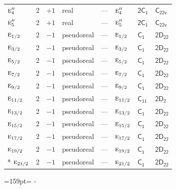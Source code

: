 \documentclass[10pt,a4paper]{article}
\makeatletter
\def\grouprule#1#2{\noalign{\marks\LTgroupmarks{\the\belowrulesep}\nobreak\vskip#1%
  \vskip\aboverulesep}\multispan\LT@cols\unskip{\leaders\hrule\@height#2\hfill\kern\z@}\cr
  \noalign{\penalty\LTrulebreak\vskip\belowrulesep\global\@lastruleclass\z@}}
\newcommand{\needspace}[1]{\par\penalty-100\begingroup\dimen0=#1\relax\dimen2=\pagegoal
  \advance\dimen2-\pagetotal\ifdim\dimen0>\dimen2\relax\ifdim\dimen2>0pt\vfil\break\fi\fi
  \endgroup}
\numberwithin{equation}{section}
\newcommand{\grp}[1]{\mathsf{#1}}
\newcommand{\irr}[1]{\text{\normalfont\scshape #1}}
\makeatother
\begin{document}
{\begin{longtable}{@{}lrrlllll@{}}
$\irr{e}_{4}''$ & 2 & $+1$ & real & --- & $\irr{e}_{4}''$ & \href{2C1.pdf}{$\grp{2C_{1}}$} & $\grp{C_{22v}}$\\
$\irr{e}_{5}''$ & 2 & $+1$ & real & --- & $\irr{e}_{5}''$ & \href{2C1.pdf}{$\grp{2C_{1}}$} & $\grp{C_{22v}}$\\
\grouprule{0pt}{\lightrulewidth}
$\irr{e}_{1/2}$ & 2 & $-1$ & pseudoreal & --- & $\irr{e}_{1/2}$ & \href{C1.pdf}{$\grp{C_{1}}$} & $\grp{2D_{22}}$\\
$\irr{e}_{3/2}$ & 2 & $-1$ & pseudoreal & --- & $\irr{e}_{3/2}$ & \href{C1.pdf}{$\grp{C_{1}}$} & $\grp{2D_{22}}$\\
$\irr{e}_{5/2}$ & 2 & $-1$ & pseudoreal & --- & $\irr{e}_{5/2}$ & \href{C1.pdf}{$\grp{C_{1}}$} & $\grp{2D_{22}}$\\
$\irr{e}_{7/2}$ & 2 & $-1$ & pseudoreal & --- & $\irr{e}_{7/2}$ & \href{C1.pdf}{$\grp{C_{1}}$} & $\grp{2D_{22}}$\\
$\irr{e}_{9/2}$ & 2 & $-1$ & pseudoreal & --- & $\irr{e}_{9/2}$ & \href{C1.pdf}{$\grp{C_{1}}$} & $\grp{2D_{22}}$\\
$\irr{e}_{11/2}$ & 2 & $-1$ & pseudoreal & --- & $\irr{e}_{11/2}$ & \href{C11.pdf}{$\grp{C_{11}}$} & \href{2D2.pdf}{$\grp{2D_{2}}$}\\
$\irr{e}_{13/2}$ & 2 & $-1$ & pseudoreal & --- & $\irr{e}_{13/2}$ & \href{C1.pdf}{$\grp{C_{1}}$} & $\grp{2D_{22}}$\\
$\irr{e}_{15/2}$ & 2 & $-1$ & pseudoreal & --- & $\irr{e}_{15/2}$ & \href{C1.pdf}{$\grp{C_{1}}$} & $\grp{2D_{22}}$\\
$\irr{e}_{17/2}$ & 2 & $-1$ & pseudoreal & --- & $\irr{e}_{17/2}$ & \href{C1.pdf}{$\grp{C_{1}}$} & $\grp{2D_{22}}$\\
$\irr{e}_{19/2}$ & 2 & $-1$ & pseudoreal & --- & $\irr{e}_{19/2}$ & \href{C1.pdf}{$\grp{C_{1}}$} & $\grp{2D_{22}}$\\*
$\irr{e}_{21/2}$ & 2 & $-1$ & pseudoreal & --- & $\irr{e}_{21/2}$ & \href{C1.pdf}{$\grp{C_{1}}$} & $\grp{2D_{22}}$\\
\bottomrule\end{longtable}}
\needspace{159pt}
\end{document}
